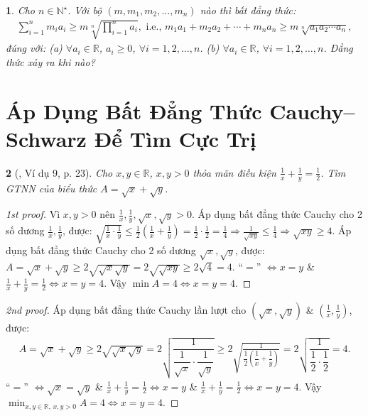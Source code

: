\documentclass{article}
\newtheorem{baitoan}{}
\begin{document}
\begin{baitoan}
	Cho $n\in\mathbb{N}^\star$. Với bộ $(m,m_1,m_2,\ldots,m_n)$ nào thì bất đẳng thức:
	\begin{align*}
		\sum_{i=1}^n m_ia_i\ge m\sqrt[n]{\prod_{i=1}^n a_i},\mbox{ i.e., } m_1a_1 + m_2a_2 + \cdots + m_na_n\ge m\sqrt[n]{a_1a_2\cdots a_n},
	\end{align*}
	đúng với: (a) $\forall a_i\in\mathbb{R}$, $a_i\ge0$, $\forall i = 1,2,\ldots,n$. (b) $\forall a_i\in\mathbb{R}$, $\forall i = 1,2,\ldots,n$.
	Đẳng thức xảy ra khi nào?
\end{baitoan}



\section{Áp Dụng Bất Đẳng Thức Cauchy--Schwarz Để Tìm Cực Trị}

\begin{baitoan}[\cite{Tuyen_Toan_9}, Ví dụ 9, p. 23]
	Cho $x,y\in\mathbb{R}$, $x,y > 0$ thỏa mãn điều kiện $\frac{1}{x} + \frac{1}{y} = \frac{1}{2}$. Tìm {\rm GTNN} của biểu thức $A = \sqrt{x} + \sqrt{y}$.
\end{baitoan}

\begin{proof}[1st proof]
	Vì $x,y > 0$ nên $\frac{1}{x},\frac{1}{y},\sqrt{x},\sqrt{y} > 0$. Áp dụng bất đẳng thức Cauchy cho 2 số dương $\frac{1}{x},\frac{1}{y}$, được: $\sqrt{\frac{1}{x}\cdot\frac{1}{y}}\le\frac{1}{2}\left(\frac{1}{x} + \frac{1}{y}\right) = \frac{1}{2}\cdot\frac{1}{2} = \frac{1}{4}\Rightarrow\frac{1}{\sqrt{xy}}\le\frac{1}{4}\Rightarrow\sqrt{xy}\ge4$. Áp dụng bất đẳng thức Cauchy cho 2 số dương $\sqrt{x},\sqrt{y}$, được: $A = \sqrt{x} + \sqrt{y}\ge2\sqrt{\sqrt{x}\sqrt{y}} = 2\sqrt{\sqrt{xy}}\ge2\sqrt{4} = 4$. ``$=$'' $\Leftrightarrow x = y$ \& $\frac{1}{x} + \frac{1}{y} = \frac{1}{2}\Leftrightarrow x = y = 4$. Vậy $\min A = 4\Leftrightarrow x = y = 4$.
\end{proof}

\begin{proof}[2nd proof]
	Áp dụng bất đẳng thức Cauchy lần lượt cho $(\sqrt{x},\sqrt{y})$ \& $\left(\frac{1}{x},\frac{1}{y}\right)$, được:
	\begin{align*}
		A = \sqrt{x} + \sqrt{y}\ge2\sqrt{\sqrt{x}\sqrt{y}} = 2\sqrt{\dfrac{1}{\dfrac{1}{\sqrt{x}}\cdot\dfrac{1}{\sqrt{y}}}}\ge2\sqrt{\frac{1}{\dfrac{1}{2}\left(\dfrac{1}{x} + \dfrac{1}{y}\right)}} = 2\sqrt{\dfrac{1}{\dfrac{1}{2}\cdot\dfrac{1}{2}}} = 4.
	\end{align*}
	``$=$'' $\Leftrightarrow \sqrt{x} = \sqrt{y}$ \& $\frac{1}{x} + \frac{1}{y} = \frac{1}{2}\Leftrightarrow x = y$ \& $\frac{1}{x} + \frac{1}{y} = \frac{1}{2}\Leftrightarrow x = y = 4$. Vậy $\min_{x,y\in\mathbb{R},\,x,y > 0} A = 4\Leftrightarrow x = y = 4$.
\end{proof}
\end{document}
